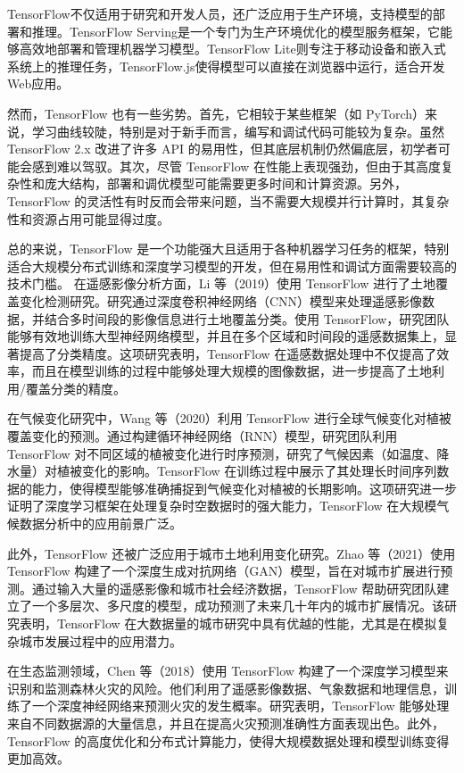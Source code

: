 \documentclass{article}
\begin{document}
	TensorFlow不仅适用于研究和开发人员，还广泛应用于生产环境，支持模型的部署和推理。TensorFlow Serving是一个专门为生产环境优化的模型服务框架，它能够高效地部署和管理机器学习模型。TensorFlow Lite则专注于移动设备和嵌入式系统上的推理任务，TensorFlow.js使得模型可以直接在浏览器中运行，适合开发Web应用。
	

	然而，TensorFlow 也有一些劣势。首先，它相较于某些框架（如 PyTorch）来说，学习曲线较陡，特别是对于新手而言，编写和调试代码可能较为复杂。虽然 TensorFlow 2.x 改进了许多 API 的易用性，但其底层机制仍然偏底层，初学者可能会感到难以驾驭。其次，尽管 TensorFlow 在性能上表现强劲，但由于其高度复杂性和庞大结构，部署和调优模型可能需要更多时间和计算资源。另外，TensorFlow 的灵活性有时反而会带来问题，当不需要大规模并行计算时，其复杂性和资源占用可能显得过度。
	
	总的来说，TensorFlow 是一个功能强大且适用于各种机器学习任务的框架，特别适合大规模分布式训练和深度学习模型的开发，但在易用性和调试方面需要较高的技术门槛。
	在遥感影像分析方面，Li 等（2019）使用 TensorFlow 进行了土地覆盖变化检测研究\cite{li2019}。研究通过深度卷积神经网络（CNN）模型来处理遥感影像数据，并结合多时间段的影像信息进行土地覆盖分类。使用 TensorFlow，研究团队能够有效地训练大型神经网络模型，并且在多个区域和时间段的遥感数据集上，显著提高了分类精度。这项研究表明，TensorFlow 在遥感数据处理中不仅提高了效率，而且在模型训练的过程中能够处理大规模的图像数据，进一步提高了土地利用/覆盖分类的精度。
	
	在气候变化研究中，Wang 等（2020）利用 TensorFlow 进行全球气候变化对植被覆盖变化的预测\cite{wang2020}。通过构建循环神经网络（RNN）模型，研究团队利用 TensorFlow 对不同区域的植被变化进行时序预测，研究了气候因素（如温度、降水量）对植被变化的影响。TensorFlow 在训练过程中展示了其处理长时间序列数据的能力，使得模型能够准确捕捉到气候变化对植被的长期影响。这项研究进一步证明了深度学习框架在处理复杂时空数据时的强大能力，TensorFlow 在大规模气候数据分析中的应用前景广泛。
	
	此外，TensorFlow 还被广泛应用于城市土地利用变化研究。Zhao 等（2021）使用 TensorFlow 构建了一个深度生成对抗网络（GAN）模型，旨在对城市扩展进行预测\cite{zhao2021}。通过输入大量的遥感影像和城市社会经济数据，TensorFlow 帮助研究团队建立了一个多层次、多尺度的模型，成功预测了未来几十年内的城市扩展情况。该研究表明，TensorFlow 在大数据量的城市研究中具有优越的性能，尤其是在模拟复杂城市发展过程中的应用潜力。
	
	在生态监测领域，Chen 等（2018）使用 TensorFlow 构建了一个深度学习模型来识别和监测森林火灾的风险\cite{chen2018}。他们利用了遥感影像数据、气象数据和地理信息，训练了一个深度神经网络来预测火灾的发生概率。研究表明，TensorFlow 能够处理来自不同数据源的大量信息，并且在提高火灾预测准确性方面表现出色。此外，TensorFlow 的高度优化和分布式计算能力，使得大规模数据处理和模型训练变得更加高效。
	
\end{document}
